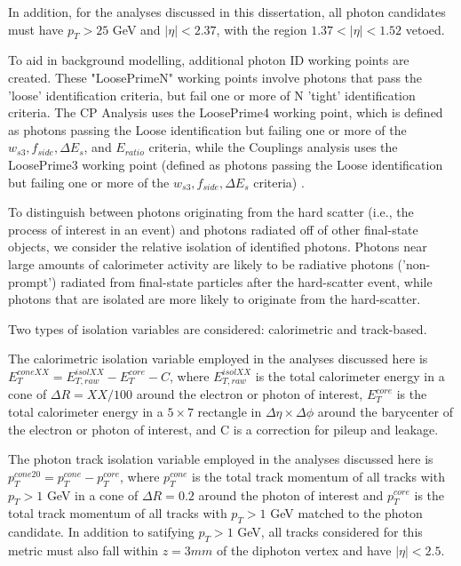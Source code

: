 In addition, for the analyses discussed in this dissertation, all photon candidates must have $p_{T} > 25$ GeV and $|\eta| < 2.37$, with the region $1.37 < |\eta| < 1.52$ vetoed. 

To aid in background modelling, additional photon ID working points are created. These "LoosePrimeN" working points involve photons that pass the 'loose' identification criteria, but fail one or more of N 'tight' identification criteria. The CP Analysis uses the LoosePrime4 working point, which is defined as photons passing the Loose identification but failing one or more of the $w_{s3}, f_{side}, \Delta E_{s}$, and $E_{ratio}$ criteria, while the Couplings analysis uses the LoosePrime3 working point (defined as photons passing the Loose identification but failing one or more of the $w_{s3}, f_{side}, \Delta E_{s}$ criteria) \cite{CERN-EP-2019-145}.

To distinguish between photons originating from the hard scatter (i.e., the process of interest in an event) and photons radiated off of other final-state objects, we consider the relative isolation of identified photons. Photons near large amounts of calorimeter activity are likely to be radiative photons ('non-prompt') radiated from final-state particles after the hard-scatter event, while photons that are isolated are more likely to originate from the hard-scatter.

Two types of isolation variables are considered: calorimetric and track-based.

The calorimetric isolation variable employed in the analyses discussed here is $E_{T}^{coneXX} = E_{T,raw}^{isolXX} -E_{T}^{core} - C$, where $E_{T,raw}^{isolXX}$ is the total calorimeter energy in a cone of $\Delta R = XX/100 $ around the electron or photon of interest, $E_{T}^{core}$ is the total calorimeter energy in a $5 \times 7$ rectangle in $\Delta \eta \times \Delta \phi$ around the barycenter of the electron or photon of interest, and C is a correction for pileup and leakage.

The photon track isolation variable employed in the analyses discussed here is $p_{T}^{cone20} = p_{T}^{cone} - p_{T}^{core}$, where $p_{T}^{cone}$ is the total track momentum of all tracks with $p_{T} > 1$ GeV in a cone of $\Delta R = 0.2$ around the photon of interest and $p_{T}^{core}$ is the total track momentum of all tracks with $p_{T} > 1$ GeV matched to the photon candidate. In addition to satifying $p_{T} > 1$ GeV, all tracks considered for this metric must also fall within $z= 3mm$ of the diphoton vertex and have $|\eta|<2.5$.

